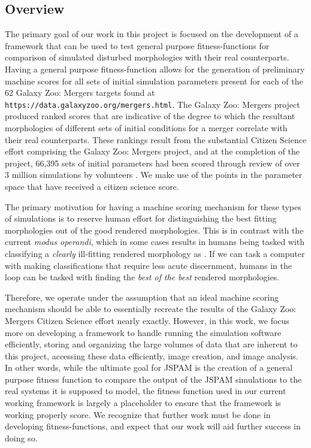 \subsection{Overview}
The primary goal of our work in this project is focused on the
development of a framework that can be used to test general purpose
fitness-functions for comparison of simulated disturbed morphologies with their
real counterparts.
Having a general purpose fitness-function
allows for the generation of preliminary machine scores for all sets of initial
simulation parameters present for each of the 62 Galaxy Zoo: Mergers targets
found at \texttt{https://data.galaxyzoo.org/mergers.html}.
The Galaxy Zoo: Mergers project produced
ranked scores that are indicative of the degree to which the resultant
morphologies of different sets of initial conditions for a merger
correlate with their real counterparts.
These rankings result from the substantial Citizen Science effort comprising
the Galaxy Zoo: Mergers project, and at the completion of the project,
66,395 sets of initial parameters had been scored through review of
over 3 million simulations by volunteers \cite{Holincheck2015}. We make use of
the points in the parameter space that have received a citizen science score.
\begin{clearpage}

\end{clearpage}

The primary motivation for having a machine scoring mechanism for these types of
simulations is to reserve human effort for distinguishing the best fitting
morphologies out of the good rendered morphologies. This is in contrast with the
current \textit{modus operandi}, which in some cases results in humans being
tasked with classifying a \textit{clearly} ill-fitting rendered morphology
as . If we can task a computer with making classifications that require
less acute discernment, humans in the
loop can be tasked with finding the \textit{best of the best} rendered
morphologies.

Therefore, we operate under the assumption that an ideal machine scoring
mechanism should be able to essentially recreate the results of the Galaxy Zoo:
Mergers Citizen Science effort nearly exactly.
However, in this work, we focus more on developing a framework to handle
running the simulation software efficiently, storing and organizing the large
volumes of data that are inherent to this project, accessing these data
efficiently, image creation, and image analysis.
In other words, while the ultimate goal for JSPAM is the creation of a general
purpose fitness function to compare the output of the JSPAM simulations to
the real systems it is supposed to model, the fitness function used in our
current working framework is largely a placeholder to ensure
that the framework is working properly score.
We recognize that further work must be done in developing fitness-functions, and
expect that our work will aid further success in doing so.

